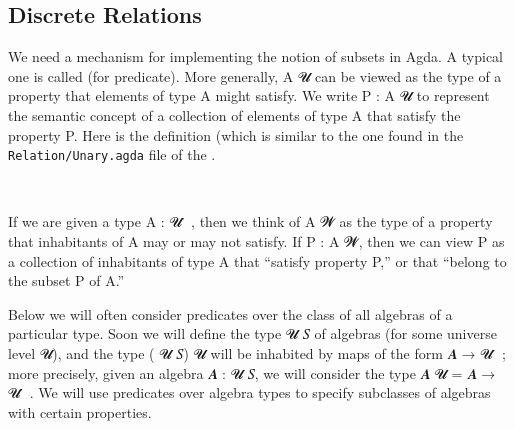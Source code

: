 \documentclass[a4paper,UKenglish,cleveref,autoref,thm-restate,11pt]{lipics-v2021}
\begin{document}
\subsection{Discrete Relations}\label{discrete-relations}

We need a mechanism for implementing the notion of subsets in Agda. A typical one is called  (for predicate). More generally,  \ab A \ab 𝓤 can be viewed as the type of a property that elements of type \ab A might satisfy. We write \ab P \as :  \ab A \ab 𝓤 to represent the semantic concept of a collection of elements of type \ab A that satisfy the property \ab P. Here is the definition (which is similar to the one found in the \texttt{Relation/Unary.agda} file of the \agdastdlib.
\ccpad
\begin{code}%
\>[0][@{}l@{\AgdaIndent{0}}]%
\>[1]\AgdaSpace{}%
\AgdaSymbol{:}\AgdaSpace{}%
%
\AgdaSpace{}%
\AgdaSpace{}%
\AgdaSymbol{(}\AgdaSpace{}%
\AgdaSymbol{:}\AgdaSpace{}%
\AgdaSymbol{)}\AgdaSpace{}%
\AgdaSpace{}%
\AgdaSpace{}%
\AgdaSpace{}%
\AgdaSpace{}%
%
\<%
\\
%
\>[1]\AgdaSpace{}%
\AgdaSpace{}%
\AgdaSpace{}%
\AgdaSymbol{=}\AgdaSpace{}%
\AgdaSpace{}%
\AgdaSpace{}%
%
\<%
\end{code}
\ccpad
If we are given a type \ab A \as : \ab 𝓤 \af ̇ , then we think of  \ab A \ab 𝓦 as the type of a property that inhabitants of \ab A may or may not satisfy. If \ab P \as :  \ab A \ab 𝓦, then we can view \ab P as a collection of inhabitants of type \ab A that ``satisfy property \ab P,'' or that ``belong to the subset \ab P of \ab A.''

Below we will often consider predicates over the class of all algebras of a particular type. Soon we will define the type  \ab 𝓤 \ab 𝑆 of algebras (for some universe level \ab 𝓤),
and the type  ( \ab 𝓤 \ab 𝑆) \ab 𝓤  %
will be inhabited by maps of the form \ab 𝑨 \as → \ab 𝓤 \af ̇ ; more precisely, given an algebra \ab 𝑨 \as :  \ab 𝓤 \ab 𝑆, we will consider the type  \ab 𝑨 \ab 𝓤 \as = \ab 𝑨 \as → \ab 𝓤 \af ̇ . We will use predicates over algebra types to specify subclasses of algebras with certain properties.
\end{document}
